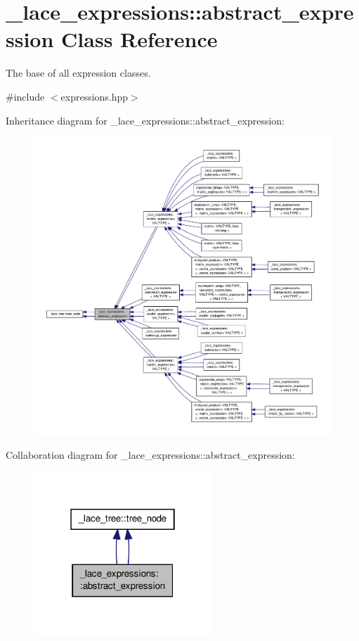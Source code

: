 \hypertarget{class__lace__expressions_1_1abstract__expression}{\section{\-\_\-lace\-\_\-expressions\-:\-:abstract\-\_\-expression Class Reference}
\label{class__lace__expressions_1_1abstract__expression}
}


The base of all expression classes.  




{\ttfamily \#include $<$expressions.\-hpp$>$}



Inheritance diagram for \-\_\-lace\-\_\-expressions\-:\-:abstract\-\_\-expression\-:\nopagebreak
\begin{figure}[H]
\begin{center}
\leavevmode
\includegraphics[width=350pt]{class__lace__expressions_1_1abstract__expression__inherit__graph}
\end{center}
\end{figure}


Collaboration diagram for \-\_\-lace\-\_\-expressions\-:\-:abstract\-\_\-expression\-:\nopagebreak
\begin{figure}[H]
\begin{center}
\leavevmode
\includegraphics[width=190pt]{class__lace__expressions_1_1abstract__expression__coll__graph}
\end{center}
\end{figure}
